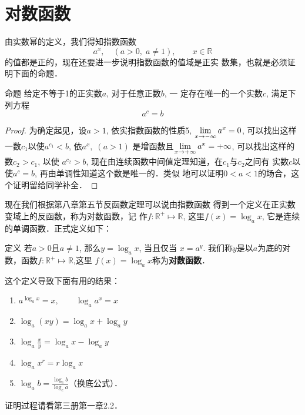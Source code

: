 \section{对数函数}

由实数幂的定义，我们得知指数函数
\[a^x,\quad (a>0,\;a\ne 1),\qquad x\in\mathbb{R}\]
的值都是正的，现在还要进一步说明指数函数的值域是正实
数集，也就是必须证明下面的命题．

\begin{blk}{命题}
   给定不等于1的正实数$a$, 对于任意正数$b$, 一
定存在唯一的一个实数$c$, 满足下列方程
$$a^c=b$$
\end{blk}

\begin{proof}
  为确定起见，设$a>1$, 依实指数函数的性质5,
$\displaystyle\lim_{x\to-\infty}a^x=0$, 可以找出这样一数$c_1$以使$a^{c_1}<b$, 依$a^x,\;(a>1)$
是增函数且$\displaystyle\lim_{x\to+\infty}a^x=+\infty$, 可以找出这样的数$c_2>c_1$, 以使
$a^{c_2}>b$, 现在由连续函数中间值定理知道，在$c_1$与$c_2$之间有
实数$c$以使$a^c=b$, 再由单调性知道这个数是唯一的．类似
地可以证明$0<a<1$的场合，这个证明留给同学补全．
\end{proof}


现在我们根据第八章第五节反函数定理可以说由指数函数
得到一个定义在正实数变域上的反函数，称为对数函数，记
作$f:\mathbb{R}^+\mapsto \mathbb{R}$, 这里$f(x)=\log_a x$, 它是连续的单调函数．正式定义如下：

\begin{blk}{定义}
   若$a>0$且$a\ne 1$, 那么$y=\log_a x$, 当且仅当
$x=a^y$. 我们称$y$是以$a$为底的对数，函数$f:\mathbb{R}^+\mapsto \mathbb{R}$,这里
$f(x)=\log_a x$称为\textbf{对数函数}．
\end{blk}

这个定义导致下面有用的结果：
\begin{enumerate}
  \item $a^{\log_a x}=x,\qquad \log_a a^x=x$
  \item $\log_a (xy)=\log_a x+\log_a y$
  \item $\log_a \frac{x}{y}=\log_a x-\log_a y$
  \item $\log_a x^r=r\log_a x$
  \item $\log_a b=\frac{\log_c b}{\log_c a}$（换底公式）．
\end{enumerate}
证明过程请看第三册第一章2.2．

